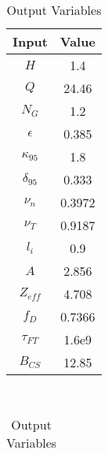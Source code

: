 \begin{table}[h!]
\centering  
\caption{Demo Steady Variables}
\hfill
\begin{subtable}[t]{0.4\textwidth}
\centering  
\caption{Input Variables} ~\\
\begin{tabular}{ c|c } 

Input            & Value           \\
\hline
$H$              & 1.4             \\
$Q$              & 24.46           \\
$N_{G}$          & 1.2             \\
$\epsilon$       & 0.385           \\
$\kappa_{95}$    & 1.8             \\
$\delta_{95}$    & 0.333           \\
$\nu_{n}$        & 0.3972          \\
$\nu_{T}$        & 0.9187          \\
$l_{i}$          & 0.9             \\
$A$              & 2.856           \\
$Z_{eff}$        & 4.708           \\
$f_{D}$          & 0.7366          \\
$\tau_{FT}$      & 1.6e9           \\
$B_{CS}$         & 12.85           \\

\end{tabular}
\end{subtable}
\hfill
\begin{subtable}[t]{0.5\textwidth}
\centering  
\caption{Output Variables} ~\\
\begin{tabular}{ c|c|c } 


\end{tabular}
\end{subtable}
\end{table}
